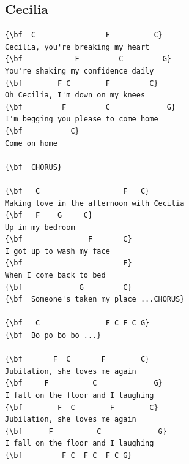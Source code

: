\documentclass[a4paper]{article}
\begin{document}
\subsection{Cecilia}
\begin{multicols}{2}\begin{Verbatim}[commandchars=\\\{\}]
{\bf  C                F          C}
Cecilia, you're breaking my heart
{\bf            F         C         G}
You're shaking my confidence daily
{\bf        F C        F         C}
Oh Cecilia, I'm down on my knees
{\bf         F         C             G}
I'm begging you please to come home
{\bf           C}
Come on home

{\bf  CHORUS}

{\bf   C                   F   C}
Making love in the afternoon with Cecilia
{\bf   F    G     C}
Up in my bedroom
{\bf               F       C}
I got up to wash my face
{\bf                       F}
When I come back to bed
{\bf             G         C}
{\bf  Someone's taken my place ...CHORUS}

{\bf   C               F C F C G}
{\bf  Bo po bo bo ...}

{\bf       F  C       F        C}
Jubilation, she loves me again
{\bf     F          C             G}
I fall on the floor and I laughing
{\bf        F  C        F        C}
Jubilation, she loves me again
{\bf      F          C             G}
I fall on the floor and I laughing
{\bf         F C  F C  F C G}

\end{Verbatim}
\end{multicols}\newpage
\end{document}
